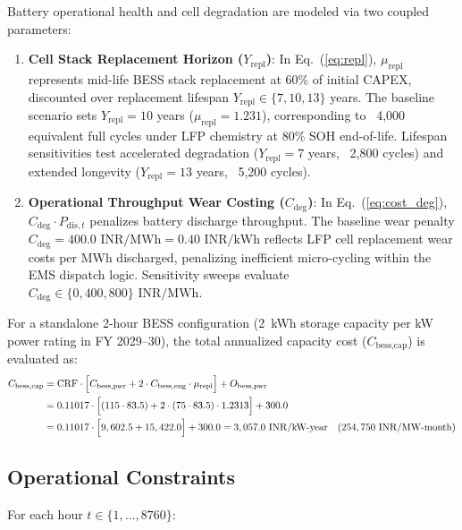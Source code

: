 \documentclass[11pt,a4paper]{article}
\begin{document}
Battery operational health and cell degradation are modeled via two coupled parameters:
\begin{enumerate}
    \item \textbf{Cell Stack Replacement Horizon ($Y_{\text{repl}}$)}: In Eq.~(\ref{eq:repl}), $\mu_{\text{repl}}$ represents mid-life BESS stack replacement at 60\% of initial CAPEX, discounted over replacement lifespan $Y_{\text{repl}} \in \{7, 10, 13\}$ years. The baseline scenario sets $Y_{\text{repl}} = 10$ years ($\mu_{\text{repl}} = 1.231$), corresponding to ~4,000 equivalent full cycles under LFP chemistry at 80\% SOH end-of-life. Lifespan sensitivities test accelerated degradation ($Y_{\text{repl}} = 7$ years, ~2,800 cycles) and extended longevity ($Y_{\text{repl}} = 13$ years, ~5,200 cycles).
    \item \textbf{Operational Throughput Wear Costing ($C_{\text{deg}}$)}: In Eq.~(\ref{eq:cost_deg}), $C_{\text{deg}} \cdot P_{\text{dis},t}$ penalizes battery discharge throughput. The baseline wear penalty $C_{\text{deg}} = 400.0\text{ INR/MWh} = 0.40\text{ INR/kWh}$ reflects LFP cell replacement wear costs per MWh discharged, penalizing inefficient micro-cycling within the EMS dispatch logic. Sensitivity sweeps evaluate $C_{\text{deg}} \in \{0, 400, 800\}\text{ INR/MWh}$.
\end{enumerate}

For a standalone 2-hour BESS configuration (2~kWh storage capacity per kW power rating in FY 2029--30), the total annualized capacity cost ($C_{\text{bess,cap}}$) is evaluated as:
\begin{align}
C_{\text{bess,cap}} &= \text{CRF} \cdot \Big[ C_{\text{bess,pwr}} + 2 \cdot C_{\text{bess,eng}} \cdot \mu_{\text{repl}} \Big] + O_{\text{bess,pwr}} \label{eq:bess_cap_cost} \\
&= 0.11017 \cdot \Big[ (115 \cdot 83.5) + 2 \cdot (75 \cdot 83.5) \cdot 1.2313 \Big] + 300.0 \notag \\
&= 0.11017 \cdot \Big[ 9,602.5 + 15,422.0 \Big] + 300.0 = 3,057.0\text{ INR/kW-year} \quad (254,750\text{ INR/MW-month}) \notag
\end{align}

\subsection{Operational Constraints}
\label{sec:constraints}

For each hour $t \in \{1, \dots, 8760\}$:
\end{document}
